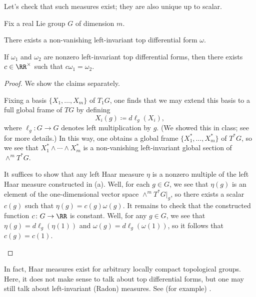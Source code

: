 \documentclass{amsart}
\begin{document}
Let's check that such measures exist; they are also unique up to scalar.
\begin{proposition} \label{prop:haar-unique}
	Fix a real Lie group $G$ of dimension $m$.
	\begin{listalph}
		\item There exists a non-vanishing left-invariant top differential form $\omega$.
		\item If $\omega_1$ and $\omega_2$ are nonzero left-invariant top differential forms, then there exists $c\in\RR^\times$ such that $c\omega_1=\omega_2$.
	\end{listalph}
\end{proposition}
\begin{proof}
	We show the claims separately.
	\begin{listalph}
		\item Fixing a basis $\{X_1,\ldots,X_m\}$ of $T_1G$, one finds that we may extend this basis to a full global frame of $TG$ by defining
		\[X_i(g)\coloneqq d\ell_g(X_i),\]
		where $\ell_g\colon G\to G$ denotes left multiplication by $g$. (We showed this in class; see \cite[Theorem~8.37]{lee-manifolds} for more details.) In this way, one obtains a global frame $\{X_1^*,\ldots,X_m^*\}$ of $T^*G$, so we see that $X_1^*\land\cdots\land X_m^*$ is a non-vanishing left-invariant global section of $\land^mT^*G$.
		\item It suffices to show that any left Haar measure $\eta$ is a nonzero multiple of the left Haar measure constructed in (a). Well, for each $g\in G$, we see that $\eta(g)$ is an element of the one-dimensional vector space $\land^mT^*G|_g$, so there exists a scalar $c(g)$ such that $\eta(g)=c(g)\omega(g)$. It remains to check that the constructed function $c\colon G\to\RR$ is constant. Well, for any $g\in G$, we see that $\eta(g)=d\ell_g(\eta(1))$ and $\omega(g)=d\ell_g(\omega(1))$, so it follows that $c(g)=c(1)$.
		\qedhere
	\end{listalph}
\end{proof}
\begin{remark}
	In fact, Haar measures exist for arbitrary locally compact topological groups. Here, it does not make sense to talk about top differential forms, but one may still talk about left-invariant (Radon) measures. See (for example) \cite[Chapter~1]{de-harmonic-analysis}.
\end{remark}
\end{document}
